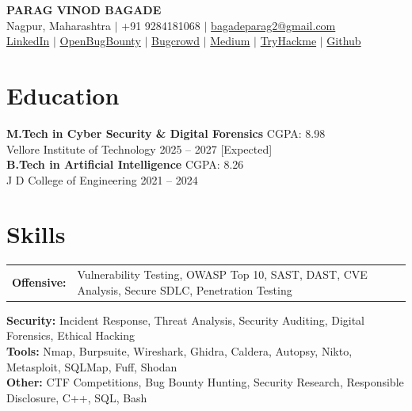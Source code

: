 \documentclass[10pt,a4paper]{article}
\begin{document}
\begin{center}
    {\Huge \textbf{PARAG VINOD BAGADE}} \\
    \vspace{4pt}
    Nagpur, Maharashtra $|$ +91 9284181068 $|$ \href{mailto:bagade1122@gmail.com}{bagadeparag2@gmail.com} \\
    \vspace{2pt}
    \href{https://in.linkedin.com/in/parag-bagade-2597b1150}{LinkedIn} $|$ \href{https://www.openbugbounty.org/researchers/D3F4ULT/}{OpenBugBounty} $|$ \href{https://bugcrowd.com/h/Parag_B}{Bugcrowd}  $|$ \href{https://medium.com/@bagade1122}{Medium} $|$
    \href{https://tryhackme.com/p/parag4455}{TryHackme}
     $|$
    \href{https://github.com/parag25mcf10022}{Github}
\end{center}

\section{Education}
\textbf{M.Tech in Cyber Security \& Digital Forensics }  \hfill CGPA: 8.98  \\ Vellore Institute of Technology  \hfill 2025 -- 2027 [Expected]  \\  
\vspace{4pt}
\textbf{B.Tech in Artificial Intelligence} \hfill CGPA: 8.26 \\
 J D College of Engineering  \hfill 2021 -- 2024 \\
\section{Skills}
\noindent
\begin{tabularx}{\textwidth}{@{}p{1.3cm} X@{}}
    \textbf{Offensive:} & Vulnerability Testing, OWASP Top 10, SAST, DAST, CVE Analysis, Secure SDLC, Penetration Testing\\
\end{tabularx}
\textbf{Security:} Incident Response, Threat Analysis, Security Auditing, Digital Forensics, Ethical Hacking \\
\textbf{Tools:} Nmap, Burpsuite, Wireshark, Ghidra, Caldera, Autopsy, Nikto, Metasploit, SQLMap, Fuff, Shodan\\
\textbf{Other:} CTF Competitions, Bug Bounty Hunting, Security Research, Responsible Disclosure, C++, SQL, Bash


\end{document}
